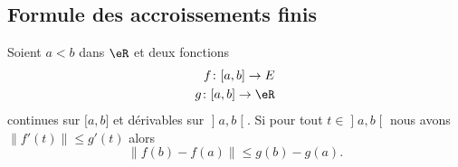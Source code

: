 \subsection{Formule des accroissements finis}

\begin{proposition} \label{PropDQLhSoy}
    Soient \( a<b\) dans \( \eR\) et deux fonctions
    \begin{subequations}
        \begin{align}
            f\colon \mathopen[ a , b \mathclose]\to E\\
            g\colon \mathopen[ a , b \mathclose]\to \eR
        \end{align}
    \end{subequations}
    continues sur \( \mathopen[ a , b \mathclose]\) et dérivables sur \( \mathopen] a , b \mathclose[\). Si pour tout \( t\in\mathopen] a , b \mathclose[\) nous avons \( \| f'(t) \|\leq g'(t)\) alors
        \begin{equation}
            \| f(b)-f(a) \|\leq g(b)-g(a).
        \end{equation}
\end{proposition}

